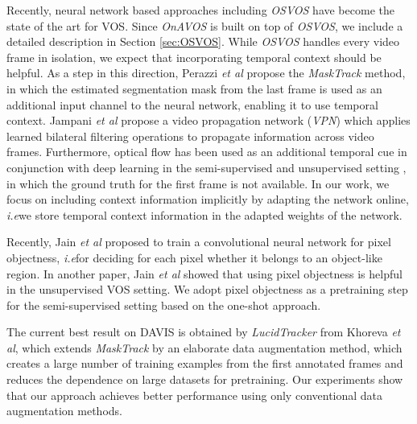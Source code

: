 \documentclass{bmvc2k}
\newcommand{\methodname}[1]{\mbox{\emph{#1}}}
\def\etal{\emph{et al}\bmvaOneDot}
\def\ie{\emph{i.e}\bmvaOneDot}
\begin{document}
Recently, neural network based approaches \cite{OSVOS, masktrack, lucidtracker, fusionseg} including \methodname{OSVOS} \cite{OSVOS} have become the state of the art for VOS. Since \methodname{OnAVOS} is built on top of \methodname{OSVOS}, we include a detailed description in Section \ref{sec:OSVOS}. While \methodname{OSVOS} handles every video frame in isolation, we expect that incorporating temporal context should be helpful. As a step in this direction, Perazzi \etal \cite{masktrack} propose the \methodname{MaskTrack} method, in which the estimated segmentation mask from the last frame is used as an additional input channel to the neural network, enabling it to use temporal context. Jampani \etal \cite{videopropnetworks} propose a video propagation network (\methodname{VPN}) which applies learned bilateral filtering operations to propagate information across video frames. Furthermore, optical flow has been used as an additional temporal cue in conjunction with deep learning in the semi-supervised \cite{masktrack, lucidtracker} and unsupervised setting \cite{motionpatterns}, in which the ground truth for the first frame is not available. In our work, we focus on including context information implicitly by adapting the network online, \ie we store temporal context information in the adapted weights of the network.

Recently, Jain \etal \cite{pixelobjectness} proposed to train a convolutional neural network for pixel objectness, \ie for deciding for each pixel whether it belongs to an object-like region. In another paper, Jain \etal \cite{fusionseg} showed that using pixel objectness is helpful in the unsupervised VOS setting. We adopt pixel objectness as a pretraining step for the semi-supervised setting based on the one-shot approach.

The current best result on DAVIS is obtained by \methodname{LucidTracker} from Khoreva \etal \cite{lucidtracker}, which extends \methodname{MaskTrack} by an elaborate data augmentation method, which creates a large number of training examples from the first annotated frames and reduces the dependence on large datasets for pretraining. Our experiments show that our approach achieves better performance using only conventional data augmentation methods.
\end{document}
